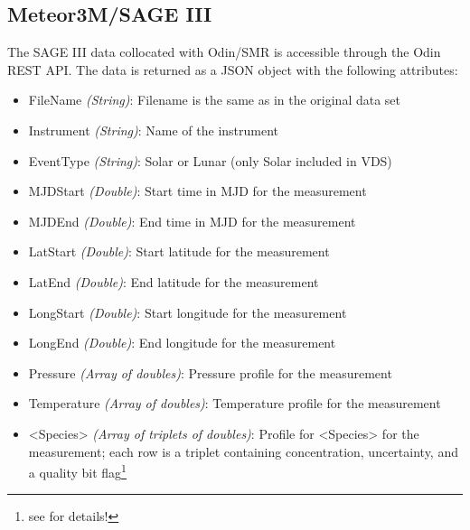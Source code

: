 \subsection{Meteor3M/SAGE III}
The SAGE III data collocated with Odin/SMR is accessible through the Odin REST
API. The data is returned as a JSON object with the following attributes:
\begin{itemize}
    \item FileName    \emph{(String)}: Filename is the same as in the original
        data set \\
    \item Instrument  \emph{(String)}: Name of the instrument \\
    \item EventType   \emph{(String)}: Solar or Lunar (only Solar included in
        VDS) \\
    \item MJDStart    \emph{(Double)}: Start time in MJD for the measurement \\
    \item MJDEnd      \emph{(Double)}: End time in MJD for the measurement \\
    \item LatStart    \emph{(Double)}: Start latitude for the measurement \\
    \item LatEnd      \emph{(Double)}: End latitude for the measurement \\
    \item LongStart   \emph{(Double)}: Start longitude for the measurement \\
    \item LongEnd     \emph{(Double)}: End longitude for the measurement \\
    \item Pressure    \emph{(Array of doubles)}: Pressure profile for the
        measurement \\
    \item Temperature \emph{(Array of doubles)}: Temperature profile for the
        measurement \\
    \item <Species>   \emph{(Array of triplets of doubles)}: Profile for
        <Species> for the measurement; each row is a triplet containing
        concentration, uncertainty, and a quality bit
        flag\footnote{see \cite{SAGEIII_DPUG} for details!} \\
\end{itemize}



